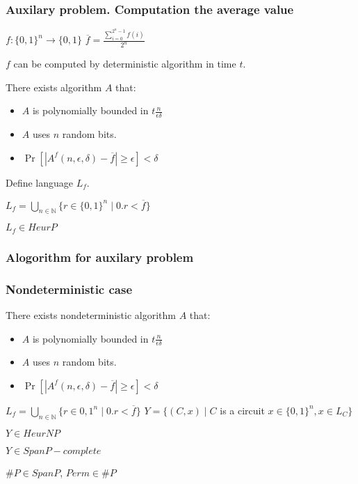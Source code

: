 \begin{frame}
    \frametitle{Auxilary problem. Computation the average value}

    $f:\{0, 1\}^{n} \rightarrow \{0, 1\}$
    $\overline{f} = \frac{\sum\limits_{i = 0}^{2^n - 1}f(i)}{2^n}$

    $f$ can be computed by deterministic algorithm in time $t$.

    \begin{proposition}%
        There exists algorithm $A$ that:
        \begin{itemize}
	        \item $A$ is polynomially bounded in $t\frac{n}{\epsilon\delta}$
        	\item $A$ uses $n$ random bits.
        	\item $\Pr[|A^{f}(n, \epsilon, \delta) - \overline{f}| \ge \epsilon] <
		        \delta$
        \end{itemize}
    \end{proposition}

    Define language $L_f$.

    $L_f = \bigcup\limits_{n \in \mathbb{N}}\{r \in \{0, 1\}^n \mid 0.r < \overline{f}\}$

    \begin{lemma}
        $L_f \in HeurP$
    \end{lemma}
\end{frame}


\begin{frame}
    \frametitle{Alogorithm for auxilary problem}

    
\end{frame}
\begin{frame}
    \frametitle{Nondeterministic case}

    \begin{proposition}%
        There exists nondeterministic algorithm $A$ that:
        \begin{itemize}
	        \item $A$ is polynomially bounded in $t\frac{n}{\epsilon\delta}$
        	\item $A$ uses $n$ random bits.
        	\item $\Pr[|A^{f}(n, \epsilon, \delta) - \overline{f}| \ge \epsilon] <
		        \delta$
        \end{itemize}
    \end{proposition}

    $L_f = \bigcup\limits_{n \in \mathbb{N}}\{r \in {0, 1}^n \mid 0.r < \overline{f}\}$
	$Y = \{(C, x) \mid C$ is a circuit $x \in \{0, 1\}^n, x \in L_{C}\}$
    
    \begin{lemma}
        $Y \in HeurNP$
    \end{lemma}

    \begin{proposition}
        $Y \in SpanP-complete$
    \end{proposition}
    
    $\#P \in SpanP$, $Perm \in \#P$
\end{frame}

